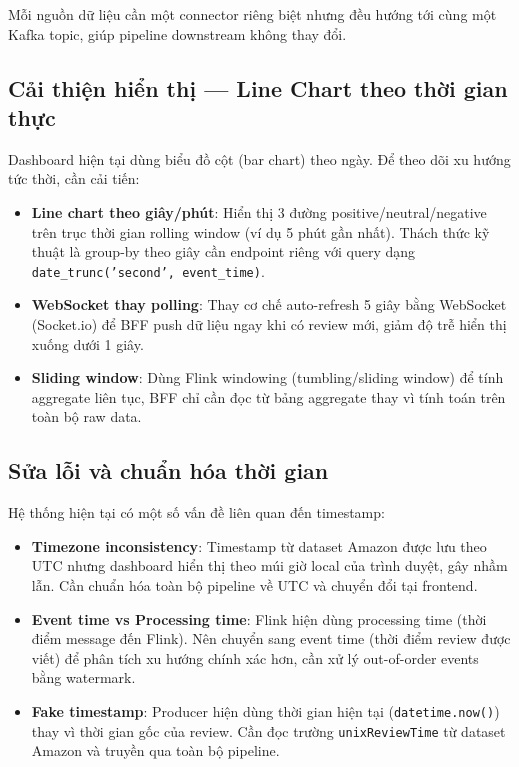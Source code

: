 Mỗi nguồn dữ liệu cần một connector riêng biệt nhưng đều hướng tới cùng một Kafka topic, giúp pipeline downstream không thay đổi.

\subsection{Cải thiện hiển thị — Line Chart theo thời gian thực}

Dashboard hiện tại dùng biểu đồ cột (bar chart) theo ngày. Để theo dõi xu hướng tức thời, cần cải tiến:

\begin{itemize}
    \item \textbf{Line chart theo giây/phút}: Hiển thị 3 đường positive/neutral/negative trên trục thời gian rolling window (ví dụ 5 phút gần nhất). Thách thức kỹ thuật là group-by theo giây cần endpoint riêng với query dạng \texttt{date\_trunc('second', event\_time)}.
    \item \textbf{WebSocket thay polling}: Thay cơ chế auto-refresh 5 giây bằng WebSocket (Socket.io) để BFF push dữ liệu ngay khi có review mới, giảm độ trễ hiển thị xuống dưới 1 giây.
    \item \textbf{Sliding window}: Dùng Flink windowing (tumbling/sliding window) để tính aggregate liên tục, BFF chỉ cần đọc từ bảng aggregate thay vì tính toán trên toàn bộ raw data.
\end{itemize}

\subsection{Sửa lỗi và chuẩn hóa thời gian}

Hệ thống hiện tại có một số vấn đề liên quan đến timestamp:

\begin{itemize}
    \item \textbf{Timezone inconsistency}: Timestamp từ dataset Amazon được lưu theo UTC nhưng dashboard hiển thị theo múi giờ local của trình duyệt, gây nhầm lẫn. Cần chuẩn hóa toàn bộ pipeline về UTC và chuyển đổi tại frontend.
    \item \textbf{Event time vs Processing time}: Flink hiện dùng processing time (thời điểm message đến Flink). Nên chuyển sang event time (thời điểm review được viết) để phân tích xu hướng chính xác hơn, cần xử lý out-of-order events bằng watermark.
    \item \textbf{Fake timestamp}: Producer hiện dùng thời gian hiện tại (\texttt{datetime.now()}) thay vì thời gian gốc của review. Cần đọc trường \texttt{unixReviewTime} từ dataset Amazon và truyền qua toàn bộ pipeline.
\end{itemize}

